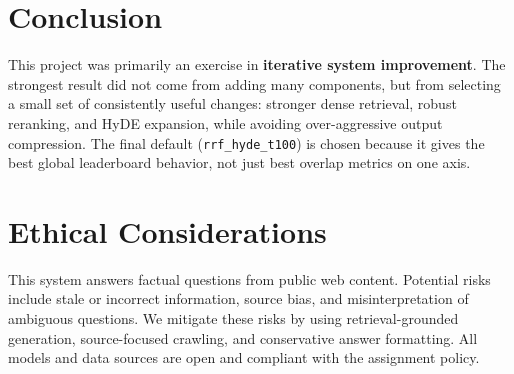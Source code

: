 \documentclass[11pt,twocolumn]{article}
\begin{document}
\section{Conclusion}
This project was primarily an exercise in \textbf{iterative system improvement}. The strongest result did not come from adding many components, but from selecting a small set of consistently useful changes: stronger dense retrieval, robust reranking, and HyDE expansion, while avoiding over-aggressive output compression. The final default (\texttt{rrf\_hyde\_t100}) is chosen because it gives the best global leaderboard behavior, not just best overlap metrics on one axis.

\section*{Ethical Considerations}
This system answers factual questions from public web content. Potential risks include stale or incorrect information, source bias, and misinterpretation of ambiguous questions. We mitigate these risks by using retrieval-grounded generation, source-focused crawling, and conservative answer formatting. All models and data sources are open and compliant with the assignment policy.



\end{document}
